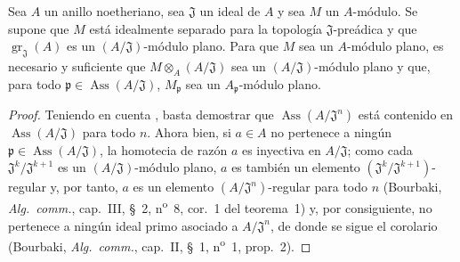 \begin{corollary}[11.4.10]
\label{IV.11.4.10}
Sea $A$ un anillo noetheriano, sea $\mathfrak J$ un ideal de $A$ y sea $M$ un $A$-módulo.
Se supone que $M$ está idealmente separado para la topología $\mathfrak J$-preádica y que $\operatorname{gr}_{\mathfrak J}(A)$ es un
$(A/\mathfrak J)$-módulo plano. Para que $M$ sea un $A$-módulo plano, es necesario y suficiente que $M\otimes_A(A/\mathfrak J)$ sea
un $(A/\mathfrak J)$-módulo plano y que, para todo $\mathfrak p\in\operatorname{Ass}(A/\mathfrak J)$, $M_{\mathfrak p}$ sea un $A_{\mathfrak p}$-módulo plano.
\end{corollary}

\begin{proof}

Teniendo en cuenta , basta demostrar que $\operatorname{Ass}(A/\mathfrak J^n)$ está contenido en
$\operatorname{Ass}(A/\mathfrak J)$ para todo $n$. Ahora bien, si $a\in A$ no pertenece a ningún $\mathfrak p\in\operatorname{Ass}(A/\mathfrak J)$, la homotecia
de razón $a$ es inyectiva en $A/\mathfrak J$; como cada $\mathfrak J^k/\mathfrak J^{k+1}$ es un $(A/\mathfrak J)$-módulo
plano, $a$ es también un elemento $(\mathfrak J^k/\mathfrak J^{k+1})$-regular y, por tanto, $a$ es un elemento $(A/\mathfrak J^n)$-regular para todo $n$
(Bourbaki, \emph{Alg.\ comm.}, cap.~III, \S~2, n\textsuperscript{o}~8, cor.~1 del teorema~1) y, por consiguiente, no pertenece
a ningún ideal primo asociado a $A/\mathfrak J^n$, de donde se sigue el corolario (Bourbaki, \emph{Alg.\ comm.}, cap.~II,
\S~1, n\textsuperscript{o}~1, prop.~2).
\end{proof}

